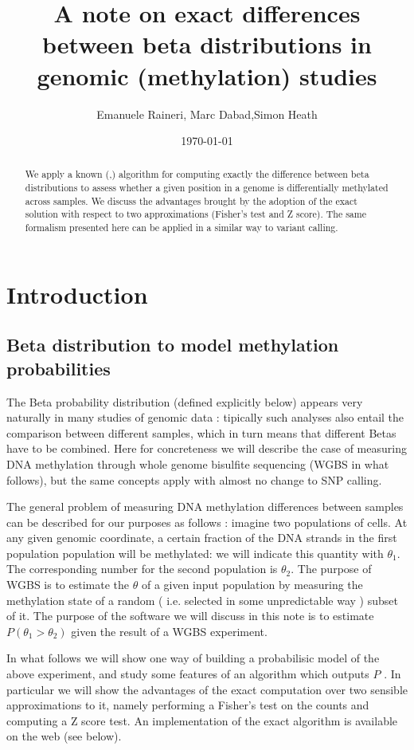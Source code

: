 \documentclass[11pt]{amsart}
\title{A note on exact differences between beta distributions in genomic (methylation) studies}
\author{Emanuele Raineri, Marc Dabad,Simon Heath}
\date{\today}
\begin{document}
\begin{abstract}
We apply a known (\cite{exactbetaineq},\cite{numineq}) algorithm for computing exactly the difference between beta distributions
to assess whether a given position in a genome is differentially methylated across
samples. We discuss the advantages brought by the adoption of the exact solution
with respect to two approximations (Fisher's test and Z score).
The same formalism presented here can be applied in a similar way to variant calling.
\end{abstract}
\maketitle
\section{Introduction}
\subsection{Beta distribution to model methylation probabilities}
The Beta probability distribution (defined explicitly below)  appears very naturally in many studies of genomic data : tipically such analyses also entail the comparison between different samples, which in turn means that different Betas have to be combined. Here for concreteness we will describe the case of measuring DNA methylation through whole genome bisulfite sequencing (WGBS in what follows), but the same concepts  apply with almost no change to SNP calling. 

The general problem  of measuring DNA methylation differences between samples can be described for our purposes as follows : imagine two populations of cells. At any given genomic coordinate, a certain fraction of the DNA strands in the first population population will be methylated: we will indicate this quantity with $\theta_1$. The corresponding number for the second population is $\theta_2$. The purpose of WGBS is to estimate the $\theta$ of a given input population by measuring the methylation state of a random ( i.e. selected in some unpredictable way )  subset of it. The purpose of the software we will discuss in this note is to estimate $P(\theta_1>\theta_2)$ given the result of a WGBS experiment.

In what follows we will show one way of building a probabilisic model of the above experiment, and study some features of an algorithm which outputs $P$ . In particular we will show the advantages of the exact computation over two sensible approximations to it, namely performing a Fisher's test on the counts and computing a Z score test. An implementation of the exact algorithm is available on the web (see below).
\end{document}
